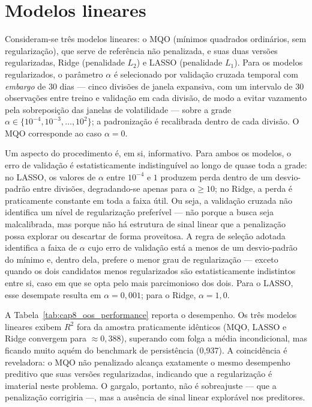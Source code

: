\section{Modelos lineares}
\label{sec:cap5_lineares}

Consideram-se três modelos lineares: o MQO (mínimos quadrados ordinários, sem
regularização), que serve de referência não penalizada, e suas duas versões
regularizadas, Ridge (penalidade $L_2$) e LASSO (penalidade $L_1$). Para os
modelos regularizados, o parâmetro $\alpha$ é selecionado por validação
cruzada temporal com \textit{embargo} de 30 dias --- cinco divisões de janela
expansiva, com um intervalo de 30 observações entre treino e validação em cada
divisão, de modo a evitar vazamento pela sobreposição das janelas de
volatilidade --- sobre a grade $\alpha \in \{10^{-4}, 10^{-3}, \ldots,
10^{2}\}$; a padronização é recalibrada dentro de cada divisão. O MQO
corresponde ao caso $\alpha = 0$.

Um aspecto do procedimento é, em si, informativo. Para ambos os modelos, o
erro de validação é estatisticamente indistinguível ao longo de quase toda a
grade: no LASSO, os valores de $\alpha$ entre $10^{-4}$ e $1$ produzem perda
dentro de um desvio-padrão entre divisões, degradando-se apenas para $\alpha
\geq 10$; no Ridge, a perda é praticamente constante em toda a faixa útil. Ou
seja, a validação cruzada não identifica um nível de regularização
preferível --- não porque a busca seja malcalibrada, mas porque não há
estrutura de sinal linear que a penalização possa explorar ou descartar de
forma proveitosa. A regra de seleção adotada identifica a faixa de $\alpha$ cujo erro de
validação está a menos de um desvio-padrão do mínimo e, dentro dela,
prefere o menor grau de regularização --- exceto quando os dois
candidatos menos regularizados são estatisticamente indistintos entre
si, caso em que se opta pelo mais parcimonioso dos dois. Para o LASSO,
esse desempate resulta em $\alpha = 0{,}001$; para o Ridge,
$\alpha = 1{,}0$.

A Tabela~\ref{tab:cap8_oos_performance} reporta o desempenho. Os três modelos
lineares exibem $R^2$ fora da amostra praticamente idênticos (MQO, LASSO e Ridge
convergem para $\approx 0{,}388$), superando com folga a média incondicional, mas
ficando muito aquém do benchmark de persistência (0{,}937). A coincidência é
reveladora: o MQO não penalizado alcança exatamente o mesmo desempenho preditivo
que suas versões regularizadas, indicando que a regularização é imaterial neste
problema. O gargalo, portanto, não é sobreajuste --- que a penalização
corrigiria ---, mas a ausência de sinal linear explorável nos preditores.

